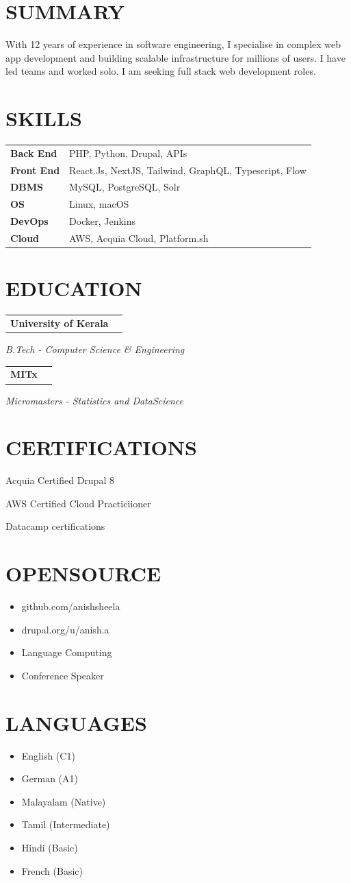 \documentclass[11pt,a4paper]{moderncv}
\newcommand*{\educationentry}[4][0.5mm]{
    \begin{tabularx}{\textwidth}{LR}
        {\bfseries #3}\\
    \end{tabularx}
    {\itshape #2}
    \par\addvspace{#1}
}
\newcommand*{\scoreentry}[1][2.5mm]{
    \par\addvspace{#1}
}
\begin{document}
\hfill
\begin{minipage}[t]{0.35\textwidth}
\section{SUMMARY}
With 12 years of experience in software engineering, I specialise in complex web app development and building scalable infrastructure for millions of users. I have led teams and worked solo. I am seeking full stack web development roles.

\section{SKILLS}
\begin{tabularx}{\textwidth}{>{\bfseries}l@{\hskip 3.5mm}L}
Back End & PHP, Python, Drupal, APIs \\
Front End & React.Js, NextJS, Tailwind, GraphQL, Typescript, Flow \\
DBMS & MySQL, PostgreSQL, Solr \\
OS & Linux, macOS \\
DevOps & Docker, Jenkins \\
Cloud & AWS, Acquia Cloud, Platform.sh 
\end{tabularx}

\section{EDUCATION}
\educationentry{B.Tech - Computer Science \& Engineering}{University of Kerala}{}

\vspace{2.0mm}
\educationentry{Micromasters - Statistics and DataScience}{MITx}{}

\section{CERTIFICATIONS}
\scoreentry{Acquia Certified Drupal 8}{}
\scoreentry{AWS Certified Cloud Practiciioner}{}
\scoreentry{Datacamp certifications}{}

\section{OPENSOURCE}
\begin{itemize}
    \item github.com/anishsheela
    \item drupal.org/u/anish.a
    \item Language Computing
    \item Conference Speaker
\end{itemize}

\section{LANGUAGES}
\begin{itemize}
    \item English (C1)
    \item German (A1)
    \item Malayalam (Native)
    \item Tamil (Intermediate)
    \item Hindi (Basic)
    \item French (Basic)
\end{itemize}
\end{minipage}
\end{document}
